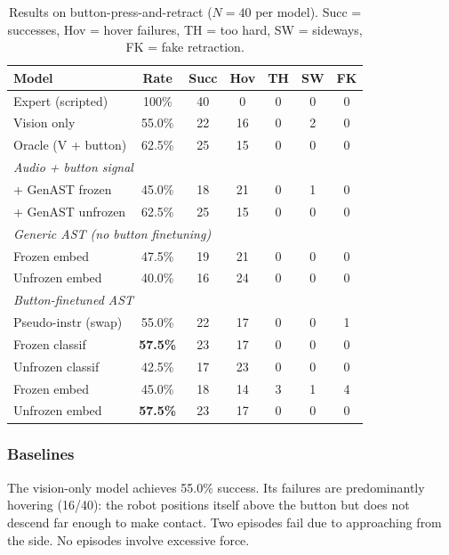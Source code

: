 \documentclass[conference]{IEEEtran}
\begin{document}
\begin{table}[t]
\caption{Results on button-press-and-retract ($N{=}40$ per model). Succ = successes, Hov = hover failures, TH = too hard, SW = sideways, FK = fake retraction.}
\label{tab:main_results}
\begin{center}
\setlength{\tabcolsep}{3pt}
\begin{tabular}{lcccccc}
\toprule
\textbf{Model} & \textbf{Rate} & \textbf{Succ} & \textbf{Hov} & \textbf{TH} & \textbf{SW} & \textbf{FK} \\
\midrule
Expert (scripted) & 100\% & 40 & 0 & 0 & 0 & 0 \\
\midrule
Vision only & 55.0\% & 22 & 16 & 0 & 2 & 0 \\
Oracle (V + button) & 62.5\% & 25 & 15 & 0 & 0 & 0 \\
\midrule
\multicolumn{7}{l}{\textit{Audio + button signal}} \\
\quad + GenAST frozen & 45.0\% & 18 & 21 & 0 & 1 & 0 \\
\quad + GenAST unfrozen & 62.5\% & 25 & 15 & 0 & 0 & 0 \\
\midrule
\multicolumn{7}{l}{\textit{Generic AST (no button finetuning)}} \\
\quad Frozen embed & 47.5\% & 19 & 21 & 0 & 0 & 0 \\
\quad Unfrozen embed & 40.0\% & 16 & 24 & 0 & 0 & 0 \\
\midrule
\multicolumn{7}{l}{\textit{Button-finetuned AST}} \\
\quad Pseudo-instr (swap) & 55.0\% & 22 & 17 & 0 & 0 & 1 \\
\quad Frozen classif & \textbf{57.5\%} & 23 & 17 & 0 & 0 & 0 \\
\quad Unfrozen classif & 42.5\% & 17 & 23 & 0 & 0 & 0 \\
\quad Frozen embed & 45.0\% & 18 & 14 & 3 & 1 & 4 \\
\quad Unfrozen embed & \textbf{57.5\%} & 23 & 17 & 0 & 0 & 0 \\
\bottomrule
\end{tabular}
\end{center}
\end{table}

\subsubsection{Baselines}

The vision-only model achieves 55.0\% success.
Its failures are predominantly hovering (16/40): the robot positions itself above the button but does not descend far enough to make contact.
Two episodes fail due to approaching from the side.
No episodes involve excessive force.
\end{document}
